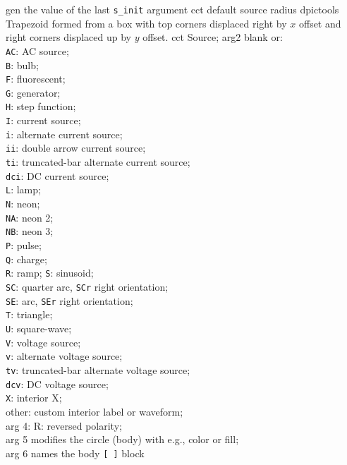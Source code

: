 %
  {gen}%
  {the value of the last {\tt s\_init} argument
    }%
%
  {cct}%
  {default source radius}%
%
  {dpictools}%
  {$\;\;$ Trapezoid formed from a box with top corners displaced right by
    $x$ offset and right corners displaced up by $y$ offset.}%
%
  {cct}%
  {Source; arg2 blank or:\\
               {\tt AC}: AC source;\\
               {\tt B}: bulb;\\
               {\tt F}: fluorescent;\\
               {\tt G}: generator;\\
               {\tt H}: step function;\\
               {\tt I}: current source;\\
               {\tt i}: alternate current source;\\
               {\tt ii}: double arrow current source;\\
               {\tt ti}: truncated-bar alternate current source;\\
               {\tt dci}: DC current source;\\
               {\tt L}: lamp;\\
               {\tt N}: neon;\\
               {\tt NA}: neon 2;\\
               {\tt NB}: neon 3;\\
               {\tt P}: pulse;\\
               {\tt Q}: charge;\\
               {\tt R}: ramp;
               {\tt S}: sinusoid;\\
               {\tt SC}: quarter arc, {\tt SCr} right orientation;\\
               {\tt SE}: arc, {\tt SEr} right orientation;\\
               {\tt T}: triangle;\\
               {\tt U}: square-wave;\\
               {\tt V}: voltage source;\\
               {\tt v}: alternate voltage source;\\
               {\tt tv}: truncated-bar alternate voltage source;\\
               {\tt dcv}: DC voltage source;\\
               {\tt X}: interior X;\\
               other: custom interior label or waveform;\\
        arg 4: R: reversed polarity;\\
        arg 5 modifies the circle (body) with e.g., color or fill;\\
        arg 6 names the body {\tt [ ]} block
   }%

